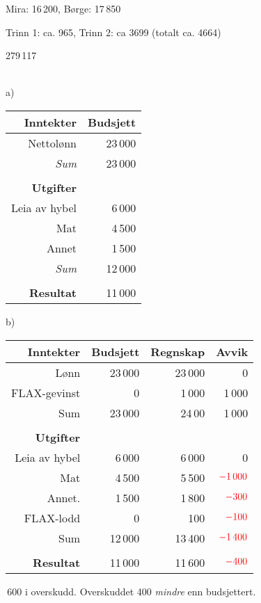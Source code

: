 

 Mira: 16\,200, Børge: 17\,850

 Trinn 1: ca. 965, Trinn 2: ca 3699 (totalt ca. 4664)


 279\,117

\\
a)\\
\begin{tabular}{r r}
	\textbf{Inntekter} & Budsjett \\ \hline 
	Nettolønn & 23\,000 \\ \hline
	\textit{Sum} & 23\,000 \\ \hline \\
	\textbf{Utgifter} & \\ \hline
	Leia av hybel & 6\,000 \\
	Mat & 4\,500 \\
	Annet & 1\,500\\ \hline
	\textit{Sum} & 12\,000\\ \hline \\ \hline
	
	\textbf{Resultat} & 11\,000\\ \hline
\end{tabular}\vsk

b)\\
\begin{tabular}{r r r r}
	\textbf{Inntekter} & Budsjett & Regnskap & Avvik \\ \hline 
	Lønn & 23\,000 & 23\,000 & 0\\
	FLAX-gevinst & 0& 1\,000 & 1\,000\\ \hline
	Sum & 23\,000 & 24\,00 & 1\,000\\\hline 
	& \\
	\textbf{Utgifter} & \\ \hline
	Leia av hybel & 6\,000 & 6\,000 &0 \\
	Mat & 4\,500 & 5\,500 & $ \color{red}-1\,000 $\\
	Annet. & 1\,500 & 1\,800 & $ \color{red}-300 $\\ 
	FLAX-lodd & 0 & 100 & $ \color{red}-100 $ \\
	\hline
	Sum & 12\,000 & 13\,400 & $ \color{red}-1\,400 $\\ \hline
	& \\ \hline
	\textbf{Resultat} & 11\,000 & 11\,600 & $ \color{red}-400 $ \\ \hline
\end{tabular}\,600 i overskudd. Overskuddet 400 \textsl{mindre} enn budsjettert.


